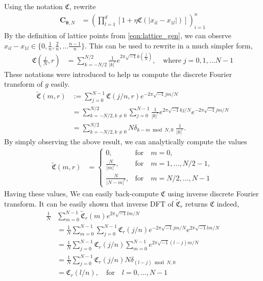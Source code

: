 \documentclass{iitthesis}          %
\newcommand{\bm}[1]{\boldsymbol{#1}}
\newcommand{\vtheta}{{\bm{\theta}}}
\newcommand{\vC}{\bm{C}}
\def\abs#1{\ensuremath{\left \lvert #1 \right \rvert}}
\begin{document}
Using the notation $\mathfrak{C}$, rewrite
\begin{align*}
\vC_{\vtheta, N}
&= \left( \prod_{l=1}^d \left[ 1 + \eta \mathfrak{C}( \abs{x_{il} - x_{1l}})\right] \right)_{i=1}^n
\end{align*}
By the definition of lattice points from \eqref{eqn:lattice_gen}, we can observe
$x_{il}-x_{1l} \in \lbrace 0, \frac 1n, \frac 2n, \dots \frac{n-1}{n}  \rbrace$. This can be used to rewrite in a much simpler form,
\begin{align*}
\mathfrak{C} \left(\frac jN, r \right) &= \sum_{k = - N/2 }^{N/2} \frac{1}{\abs{k}^r} 
e^{ 2 \pi\sqrt{-1} k (\frac jN)}, \quad \text{where} \;  j=0,1,\dots N-1
\end{align*}
These notations were introduced to help us compute the discrete Fourier transform of $g$ easily. 
\begin{align*}
\widetilde{\mathfrak{C}}(m, r) &:= \sum_{j=0}^{N-1} \mathfrak{C} (j/n, r) e^{- 2 \pi\sqrt{-1} jm/N} \\
&= \sum_{k = - N/2, k \neq 0 }^{N/2} 
\sum_{j=0}^{N-1} \frac{1}{\abs{k}^r} 
e^{ 2 \pi\sqrt{-1} k  j/N} e^{- 2 \pi\sqrt{-1} jm/N} \\
&= \sum_{k = - N/2, k \neq 0  }^{N/2} N \delta_{k-m \bmod N, 0} \; \frac{1}{\abs{k}^r}.
\end{align*}
By simply observing the above result, we can analytically compute the values
\begin{align} \label{dft_of_g}
\widetilde{\mathfrak{C}}(m, r) &= 
\begin{cases}
0, & \text{for} \quad m=0,\\
\frac{N}{\abs{m}^r}, & \text{for} \quad m=1,\dots,N/2-1, \\
\frac{N}{\abs{N-m}^r}, & \text{for} \quad m=N/2,\dots,N-1
\end{cases}
\end{align}
Having these values, We can easily back-compute $\mathfrak{C}$ using inverse discrete Fourier transform. It can be easily shown that inverse DFT of $\widetilde{\mathfrak{C}}_{r}$ returns $\mathfrak{C}$ indeed,
\begin{align*}
\frac{1}{N} &\sum_{m=0}^{N-1} \widetilde{\mathfrak{C}}_{r} (m) e^{2 \pi\sqrt{-1} lm/N} \\
& = \frac{1}{N} \sum_{m=0}^{N-1} 
\sum_{j=0}^{N-1} \mathfrak{C}_{r} (j/n) e^{- 2 \pi\sqrt{-1} jm/N}
e^{2 \pi\sqrt{-1} lm/N} \\
& = \frac{1}{N}  
\sum_{j=0}^{N-1} \mathfrak{C}_{r} (j/n) \sum_{m=0}^{N-1} e^{2 \pi\sqrt{-1} (l-j)m/N} \\
& = \frac{1}{N}  \sum_{j=0}^{N-1} \mathfrak{C}_{r} (j/n) N \delta_{(l-j) \bmod N, 0} \\
& = \mathfrak{C}_{r} (l/n), \quad \text{for} \quad l=0,\dots,N-1
\end{align*}
\end{document}
